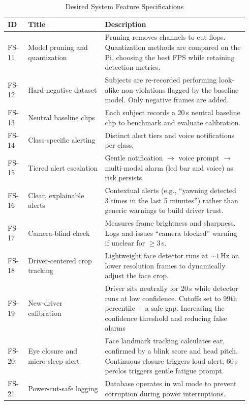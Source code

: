 \begin{table}[htbp]
\centering
\caption{Desired System Feature Specifications}
\label{tab:desired-features}
\footnotesize
\setlength{\tabcolsep}{4pt}
\renewcommand{\arraystretch}{1.15}
\begin{tabular}{|p{0.08\linewidth}|p{0.30\linewidth}|p{0.56\linewidth}|}
\hline
\textbf{ID} & \textbf{Title} & \textbf{Description} \\
\hline
FS-11 & Model pruning and quantization & Pruning removes channels to cut \glspl{flop}. Quantization methods are compared on the Pi, choosing the best FPS while retaining detection metrics. \\
\hline
FS-12 & Hard-negative dataset & Subjects are re-recorded performing look-alike non-violations flagged by the baseline model. Only negative frames are added. \\
\hline
FS-13 & Neutral baseline clips & Each subject records a 20\,s neutral baseline clip to benchmark and evaluate calibration. \\
\hline
FS-14 & Class-specific alerting & Distinct alert tiers and voice notifications per class. \\
\hline
FS-15 & Tiered alert escalation & Gentle notification $\rightarrow$ voice prompt $\rightarrow$ multi-modal alarm (\gls{led} bar and voice) as risk persists. \\
\hline
FS-16 & Clear, explainable alerts & Contextual alerts (e.g., ``yawning detected 3 times in the last 5 minutes'') rather than generic warnings to build driver trust. \\
\hline
FS-17 & Camera-blind check & Measures frame brightness and sharpness. Logs and issues ``camera blocked'' warning if unclear for $\ge 3$\,s.\\
\hline
FS-18 & Driver-centered crop tracking & Lightweight face detector runs at $\sim 1$\,Hz on lower resolution frames to dynamically adjust the face crop. \\
\hline
FS-19 & New-driver calibration & Driver sits neutrally for 20\,s while detector runs at low confidence. Cutoffs set to 99th percentile $+$ a safe gap. Increasing the confidence threshold and reducing false alarms \\
\hline
FS-20 & Eye closure and micro-sleep alert & Face landmark tracking calculates \gls{ear}, confirmed by a blink score and head pitch. Continuous closure triggers loud alert; 60\,s \gls{perclos} triggers gentle fatigue prompt.\\
\hline
FS-21 & Power-cut-safe logging & Database operates in \gls{wal} mode to prevent corruption during power interruptions. \\

\end{tabular}
\end{table}
